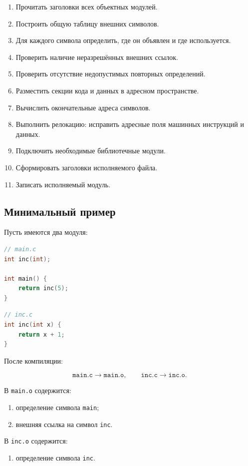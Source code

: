 \documentclass[12pt,a4paper]{article}
\begin{document}
\begin{enumerate}
  \item Прочитать заголовки всех объектных модулей.
  \item Построить общую таблицу внешних символов.
  \item Для каждого символа определить, где он объявлен и где используется.
  \item Проверить наличие неразрешённых внешних ссылок.
  \item Проверить отсутствие недопустимых повторных определений.
  \item Разместить секции кода и данных в адресном пространстве.
  \item Вычислить окончательные адреса символов.
  \item Выполнить релокацию: исправить адресные поля машинных инструкций и данных.
  \item Подключить необходимые библиотечные модули.
  \item Сформировать заголовки исполняемого файла.
  \item Записать исполняемый модуль.
\end{enumerate}

\subsection*{Минимальный пример}

Пусть имеются два модуля:

\begin{lstlisting}[language=C]
// main.c
int inc(int);

int main() {
    return inc(5);
}
\end{lstlisting}

\begin{lstlisting}[language=C]
// inc.c
int inc(int x) {
    return x + 1;
}
\end{lstlisting}

После компиляции:

\[
\texttt{main.c} \rightarrow \texttt{main.o},
\qquad
\texttt{inc.c} \rightarrow \texttt{inc.o}.
\]

В \texttt{main.o} содержится:
\begin{enumerate}
  \item определение символа \texttt{main};
  \item внешняя ссылка на символ \texttt{inc}.
\end{enumerate}

В \texttt{inc.o} содержится:
\begin{enumerate}
  \item определение символа \texttt{inc}.
\end{enumerate}
\end{document}
